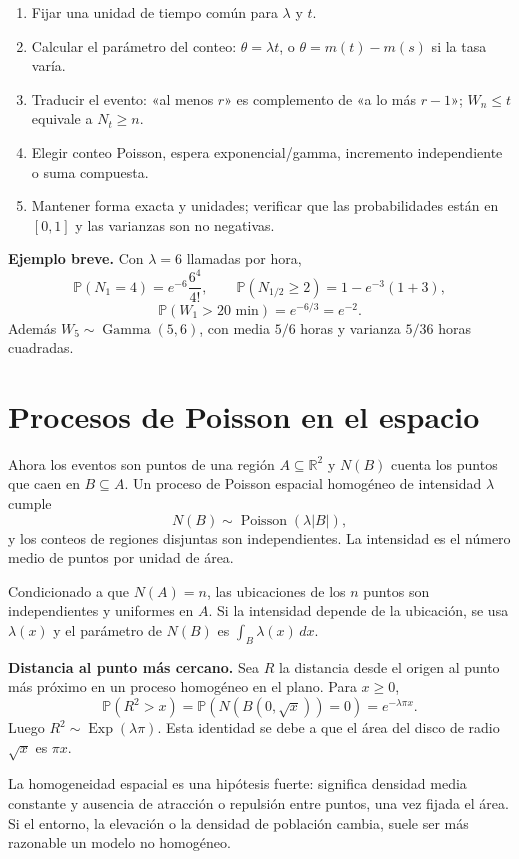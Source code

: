 \documentclass[11pt,oneside]{article}
\newcommand{\Prob}{\mathbb{P}}
\newcommand{\Pois}{\operatorname{Poisson}}
\newcommand{\Exp}{\operatorname{Exp}}
\newcommand{\GammaDist}{\operatorname{Gamma}}
\newcommand{\R}{\mathbb{R}}
\newcommand{\1}{\mathbf{1}}
\begin{document}
\begin{enumerate}
  \item Fijar una unidad de tiempo común para $\lambda$ y $t$.
  \item Calcular el parámetro del conteo: $\theta=\lambda t$, o $\theta=m(t)-m(s)$ si la tasa varía.
  \item Traducir el evento: «al menos $r$» es complemento de «a lo más $r-1$»; $W_n\leq t$ equivale a $N_t\geq n$.
  \item Elegir conteo Poisson, espera exponencial/gamma, incremento independiente o suma compuesta.
  \item Mantener forma exacta y unidades; verificar que las probabilidades están en $[0,1]$ y las varianzas son no negativas.
\end{enumerate}

\textbf{Ejemplo breve.} Con $\lambda=6$ llamadas por hora,
\[
\Prob(N_1=4)=e^{-6}\frac{6^4}{4!},\qquad
\Prob(N_{1/2}\geq2)=1-e^{-3}(1+3),
\]
\[
\Prob(W_1>20\text{ min})=e^{-6/3}=e^{-2}.
\]
Además $W_5\sim\GammaDist(5,6)$, con media $5/6$ horas y varianza $5/36$ horas cuadradas.

\section{Procesos de Poisson en el espacio}

Ahora los eventos son puntos de una región $A\subseteq\R^2$ y $N(B)$ cuenta los puntos que caen en $B\subseteq A$. Un proceso de Poisson espacial homogéneo de intensidad $\lambda$ cumple
\[
N(B)\sim\Pois(\lambda|B|),
\]
y los conteos de regiones disjuntas son independientes. La intensidad es el número medio de puntos por unidad de área.

Condicionado a que $N(A)=n$, las ubicaciones de los $n$ puntos son independientes y uniformes en $A$. Si la intensidad depende de la ubicación, se usa $\lambda(x)$ y el parámetro de $N(B)$ es $\int_B\lambda(x)\,dx$.

\textbf{Distancia al punto más cercano.} Sea $R$ la distancia desde el origen al punto más próximo en un proceso homogéneo en el plano. Para $x\geq0$,
\[
\Prob(R^2>x)=\Prob(N(B(0,\sqrt{x}))=0)
 =e^{-\lambda\pi x}.
\]
Luego $R^2\sim\Exp(\lambda\pi)$. Esta identidad se debe a que el área del disco de radio $\sqrt{x}$ es $\pi x$.

La homogeneidad espacial es una hipótesis fuerte: significa densidad media constante y ausencia de atracción o repulsión entre puntos, una vez fijada el área. Si el entorno, la elevación o la densidad de población cambia, suele ser más razonable un modelo no homogéneo.
\end{document}
